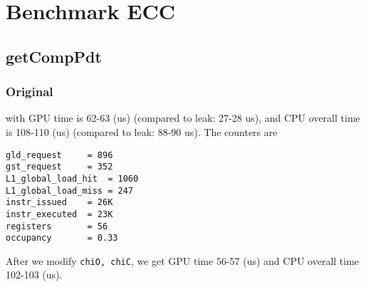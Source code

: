 
\chapter{Benchmark ECC}
\label{chap:benchmark-ecc}

\section{getCompPdt}
\label{sec:getcomppdt}

\subsection{Original}
\label{sec:original}

with GPU time is 62-63 (us) (compared to leak: 27-28 us), and CPU
overall time is 108-110 (us) (compared to leak: 88-90 us). The
counters are
\begin{verbatim}
gld_request     = 896
gst_request     = 352
L1_global_load_hit  = 1060
L1_global_load_miss = 247
instr_issued    = 26K
instr_executed  = 23K
registers       = 56
occupancy       = 0.33
\end{verbatim}


After we modify \verb!chiO, chiC!, we get GPU time 56-57 (us) and CPU
overall time 102-103 (us). 



